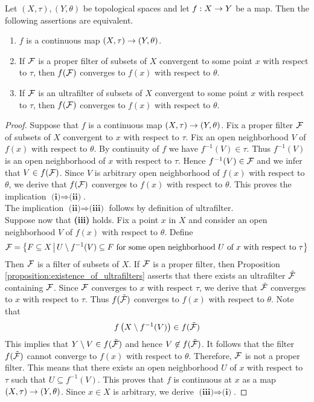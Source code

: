 \begin{proposition}\label{proposition:characterization_of_continuous_maps_in_terms_of_filters}
Let $(X,\tau),(Y,\theta)$ be topological spaces and let $f:X\rightarrow Y$ be a map. Then the following assertions are equivalent.
\begin{enumerate}[label=\emph{\textbf{(\roman*)}}, leftmargin=*]
\item $f$ is a continuous map $\left(X,\tau\right)\rightarrow \left(Y,\theta\right)$.
\item If ${\mathcal F}$ is a proper filter of subsets of $X$ convergent to some point $x$ with respect to $\tau$, then $f({\mathcal F})$ converges to $f(x)$ with respect to $\theta$.
\item If ${\mathcal F}$ is an ultrafilter of subsets of $X$ convergent to some point $x$ with respect to $\tau$, then $f({\mathcal F})$ converges to $f(x)$ with respect to $\theta$.
\end{enumerate}
\end{proposition}
\begin{proof}
Suppose that $f$ is a continuous map $\left(X,\tau\right)\rightarrow \left(Y,\theta\right)$. Fix a proper filter ${\mathcal F}$ of subsets of $X$ convergent to $x$ with respect to $\tau$. Fix an open neighborhood $V$ of $f(x)$ with respect to $\theta$. By continuity of $f$ we have $f^{-1}(V) \in \tau$. Thus $f^{-1}(V)$ is an open neighborhood of $x$ with respect to $\tau$. Hence $f^{-1}(V) \in {\mathcal F}$ and we infer that $V \in f({\mathcal F})$. Since $V$ is arbitrary open neighborhood of $f(x)$ with respect to $\theta$, we derive that $f({\mathcal F})$ converges to $f(x)$ with respect to $\theta$. This proves the implication $\textbf{(i)}\Rightarrow \textbf{(ii)}$.\\
The implication $\textbf{(ii)}\Rightarrow \textbf{(iii)}$ follows by definition of ultrafilter.\\
Suppose now that \textbf{(iii)} holds. Fix a point $x$ in $X$ and consider an open neighborhood $V$ of $f(x)$ with respect to $\theta$. Define
$${\mathcal F} = \big\{F\subseteq X\,\big|\,U\setminus f^{-1}(V)\subseteq F\mbox{ for some open neighborhood }U\mbox{ of }x\mbox{ with respect to }\tau\big\}$$
Then ${\mathcal F}$ is a filter of subsets of $X$. If ${\mathcal F}$ is a proper filter, then Proposition \ref{proposition:existence_of_ultrafilters} asserts that there exists an ultrafilter $\tilde{{\mathcal F}}$ containing ${\mathcal F}$. Since ${\mathcal F}$ converges to $x$ with respect $\tau$, we derive that $\tilde{{\mathcal F}}$ converges to $x$ with respect to $\tau$. Thus $f(\tilde{{\mathcal F}})$ converges to $f(x)$ with respect to $\theta$. Note that
$$f\left(X\setminus f^{-1}(V)\right) \in f(\tilde{{\mathcal F}})$$
This implies that $Y\setminus V \in f(\tilde{{\mathcal F}})$ and hence $V \not \in f(\tilde{{\mathcal F}})$. It follows that the filter $f(\tilde{{\mathcal F}})$ cannot converge to $f(x)$ with respect to $\theta$. Therefore, ${\mathcal F}$ is not a proper filter. This means that there exists an open neighborhood $U$ of $x$ with respect to $\tau$ such that $U \subseteq f^{-1}(V)$. This proves that $f$ is continuous at $x$ as a map $\left(X,\tau\right)\rightarrow \left(Y,\theta\right)$. Since $x\in X$ is arbitrary, we derive $\textbf{(iii)}\Rightarrow \textbf{(i)}$.
\end{proof}

